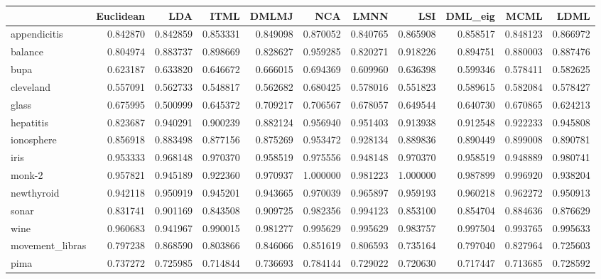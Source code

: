 \begin{tabular}{lrrrrrrrrrr}
\toprule
{} &  Euclidean &       LDA &      ITML &     DMLMJ &       NCA &      LMNN &       LSI &   DML\_eig &      MCML &      LDML \\
\midrule
appendicitis    &   0.842870 &  0.842859 &  0.853331 &  0.849098 &  0.870052 &  0.840765 &  0.865908 &  0.858517 &  0.848123 &  0.866972 \\
balance         &   0.804974 &  0.883737 &  0.898669 &  0.828627 &  0.959285 &  0.820271 &  0.918226 &  0.894751 &  0.880003 &  0.887476 \\
bupa            &   0.623187 &  0.633820 &  0.646672 &  0.666015 &  0.694369 &  0.609960 &  0.636398 &  0.599346 &  0.578411 &  0.582625 \\
cleveland       &   0.557091 &  0.562733 &  0.548817 &  0.562682 &  0.680425 &  0.578016 &  0.551823 &  0.589615 &  0.582084 &  0.578427 \\
glass           &   0.675995 &  0.500999 &  0.645372 &  0.709217 &  0.706567 &  0.678057 &  0.649544 &  0.640730 &  0.670865 &  0.624213 \\
hepatitis       &   0.823687 &  0.940291 &  0.900239 &  0.882124 &  0.956940 &  0.951403 &  0.913938 &  0.912548 &  0.922233 &  0.945808 \\
ionosphere      &   0.856918 &  0.883498 &  0.877156 &  0.875269 &  0.953472 &  0.928134 &  0.889836 &  0.890449 &  0.899008 &  0.890781 \\
iris            &   0.953333 &  0.968148 &  0.970370 &  0.958519 &  0.975556 &  0.948148 &  0.970370 &  0.958519 &  0.948889 &  0.980741 \\
monk-2          &   0.957821 &  0.945189 &  0.922360 &  0.970937 &  1.000000 &  0.981223 &  1.000000 &  0.987899 &  0.996920 &  0.938204 \\
newthyroid      &   0.942118 &  0.950919 &  0.945201 &  0.943665 &  0.970039 &  0.965897 &  0.959193 &  0.960218 &  0.962272 &  0.950913 \\
sonar           &   0.831741 &  0.901169 &  0.843508 &  0.909725 &  0.982356 &  0.994123 &  0.853100 &  0.854704 &  0.884636 &  0.876629 \\
wine            &   0.960683 &  0.941967 &  0.990015 &  0.981277 &  0.995629 &  0.995629 &  0.983757 &  0.997504 &  0.993765 &  0.995633 \\
movement\_libras &   0.797238 &  0.868590 &  0.803866 &  0.846066 &  0.851619 &  0.806593 &  0.735164 &  0.797040 &  0.827964 &  0.725603 \\
pima            &   0.737272 &  0.725985 &  0.714844 &  0.736693 &  0.784144 &  0.729022 &  0.720630 &  0.717447 &  0.713685 &  0.728592 \\

\end{tabular}
